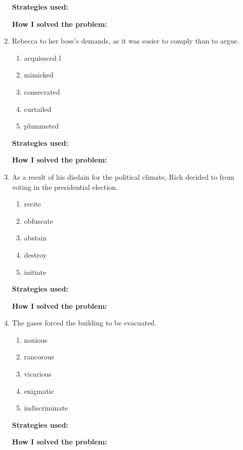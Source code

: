 \begin{enumerate}
\textbf{\large Strategies used:} \hrulefill

\textbf{\large How I solved the problem:} \hrulefill

\item Rebecca \longline to her boss’s demands, as it was easier to comply than to argue.

\begin{enumerate} [label=(\Alph*)]
\item acquiesced l
\item mimicked  
\item consecrated 
\item curtailed
\item plummeted
\end{enumerate}

\textbf{\large Strategies used:} \hrulefill

\textbf{\large How I solved the problem:} \hrulefill

\item\sloppy As a result of his disdain for the political climate, Rich decided to \longline from voting in the presidential election.

\begin{enumerate} [label=(\Alph*)]
\item recite
\item obfuscate
\item abstain
\item destroy
\item initiate
\end{enumerate}

\textbf{\large Strategies used:} \hrulefill

\textbf{\large How I solved the problem:} \hrulefill

\item The \longline gases forced the building to be evacuated.

\begin{enumerate} [label=(\Alph*)]
\item noxious
\item rancorous
\item vicarious
\item enigmatic
\item indiscriminate
\end{enumerate}

\textbf{\large Strategies used:} \hrulefill

\textbf{\large How I solved the problem:} \hrulefill

\end{enumerate}

